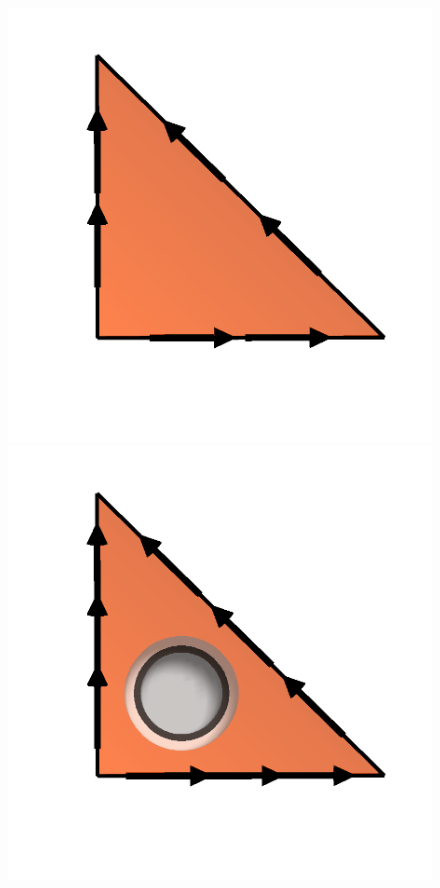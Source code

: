 \begin{figure}
  \begin{center}
    \includegraphics[width=\elmfigsizetriple]{chapters/kirby-6/png/NED2_1_2d.png}
    \includegraphics[width=\elmfigsizetriple]{chapters/kirby-6/png/NED2_2_2d.png}

\end{center}
\end{figure}
